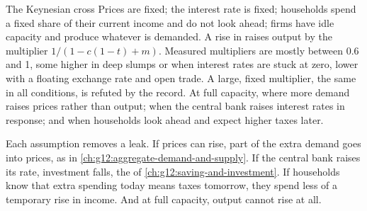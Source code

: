\begin{model}{The Keynesian cross}
%
\assumes Prices are fixed; the interest rate is fixed; households spend a fixed share of their current income and do not look ahead; firms have idle capacity and produce
  whatever is demanded.
\predicts A rise in  raises output by the multiplier $1/(1 - c(1 - t) + m)$.
\tested Measured
  multipliers are mostly between 0.6 and 1, some higher in deep slumps or when interest rates are stuck at zero, lower with a floating exchange rate and open trade. A large,
  fixed multiplier, the same in all conditions, is refuted by the record.
\breaks At full capacity, where more demand raises prices rather than output; when the central bank raises interest rates in response; and when households look ahead and
  expect higher taxes later.
\end{model}

Each assumption removes a leak. If prices can rise, part of the extra demand goes into prices, as in \cref{ch:g12:aggregate-demand-and-supply}. If the central bank raises
its rate, investment falls, the  of \cref{ch:g12:saving-and-investment}. If households know that extra spending today means taxes tomorrow, they spend less of
a temporary rise in income. And at full capacity, output cannot rise at all.

